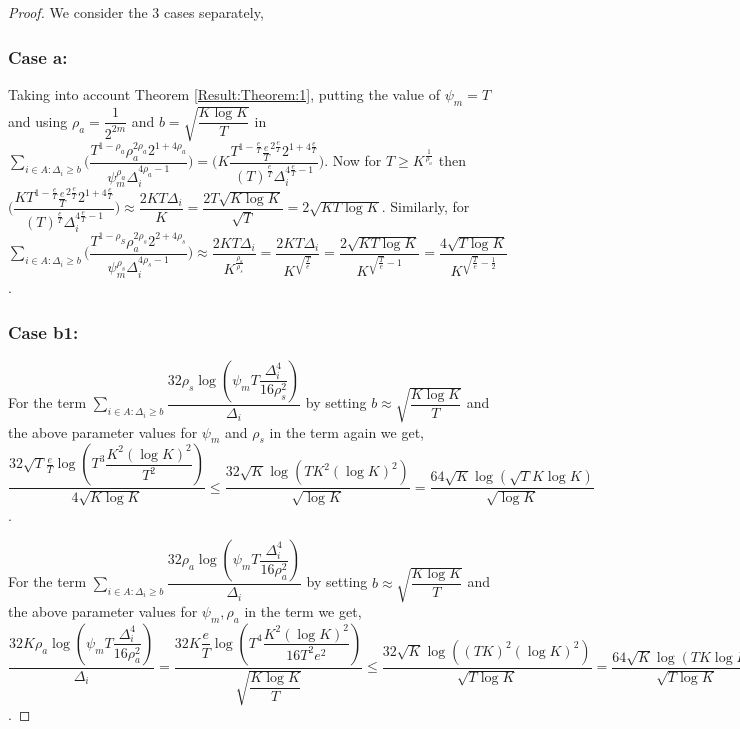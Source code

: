 \begin{proof}
We consider the $3$ cases separately,
\subsubsection{Case a:}
Taking into account Theorem \ref{Result:Theorem:1}, putting the value of $\psi_{m}=T$ and using $\rho_{a}=\dfrac{1}{2^{2m}}$ and $b=\sqrt{\dfrac{K\log K}{T}}$ in $\sum_{i\in A:\Delta_{i}\geq b}\bigg(\dfrac{T^{1-\rho_{a}}\rho_{a}^{2\rho_{a}}2^{1+4\rho_{a}}}{\psi_{m}^{\rho_{a}}\Delta_{i}^{4\rho_{a}-1}} \bigg)= \bigg(K\dfrac{T^{1-\frac{e}{T}}\frac{e}{T}^{2\frac{e}{T}}2^{1+4\frac{e}{T}}}{(T)^{\frac{e}{T}}\Delta_{i}^{4\frac{e}{T}-1}} \bigg)$.  Now for $T\geq K^{\frac{1}{\rho_{a}}}$ then $ \bigg(\dfrac{KT^{1-\frac{e}{T}}\frac{e}{T}^{2\frac{e}{T}}2^{1+4\frac{e}{T}}}{(T)^{\frac{e}{T}}\Delta_{i}^{4\frac{e}{T}-1}} \bigg)\approx\dfrac{2KT\Delta_{i}}{K}=\dfrac{2T\sqrt{K\log K}}{\sqrt{T}}= 2\sqrt{KT\log K}$. Similarly, for $\sum_{i\in A:\Delta_{i}\geq b}\bigg(\dfrac{T^{1-\rho_{S}}\rho_{a}^{2\rho_{s}}2^{2+4\rho_{s}}}{\psi_{m}^{\rho_{s}}\Delta_{i}^{4\rho_{s}-1}} \bigg) \approx\dfrac{2KT\Delta_{i}}{K^{\frac{\rho_{a}}{\rho_{s}}}}= \dfrac{2KT\Delta_{i}}{K^{\sqrt{\frac{T}{e}}}} = \dfrac{2\sqrt{KT\log K}}{K^{\sqrt{\frac{T}{e}}-1}}= \dfrac{4\sqrt{T\log K}}{K^{\sqrt{\frac{T}{e}}-\frac{1}{2}}}$.
\subsubsection{Case b1:}
\par For the term $\sum_{i\in A:\Delta_{i}\geq b}\dfrac{32\rho_{s}\log{(\psi_{m}T\dfrac{\Delta_{i}^{4}}{16\rho_{s}^{2}})}}{\Delta_{i}}$ by setting $b\approx \sqrt{\dfrac{K\log K}{T}}$ and the above parameter values for $\psi_{m}$ and $\rho_{s}$  in the term again we get,
$\dfrac{32\sqrt{T}\frac{e}{T}\log{(T^{3}\dfrac{K^{2}(\log K)^{2}}{T^{2}})}}{4\sqrt{K\log K}} \leq \dfrac{32\sqrt{K}\log{(TK^{2}(\log K)^{2})}}{\sqrt{\log K}}=\dfrac{64\sqrt{K}\log{(\sqrt{T}K\log K)}}{\sqrt{\log K}}$.
\par For the term $\sum_{i\in A:\Delta_{i}\geq b}\dfrac{32\rho_{a}\log{(\psi_{m}T\dfrac{\Delta_{i}^{4}}{16\rho_{a}^{2}})}}{\Delta_{i}}$ by setting $b\approx \sqrt{\dfrac{K\log K}{T}}$ and the above parameter values for $\psi_{m},\rho_{a}$ in the term we get, 
$\dfrac{32K\rho_{a}\log{(\psi_{m}T\dfrac{\Delta_{i}^{4}}{16\rho_{a}^{2}})}}{\Delta_{i}}= \dfrac{32K\dfrac{e}{T}\log{(T^{4}\dfrac{K^{2}(\log K)^{2}}{16T^{2}e^{2}})}}{\sqrt{\dfrac{K\log K}{T}}}\leq \dfrac{32\sqrt{K}\log{((TK)^{2}(\log K)^{2})}}{\sqrt{T\log K}}= \dfrac{64\sqrt{K}\log{(TK\log K)}}{\sqrt{T\log K}}$.

\end{proof}
